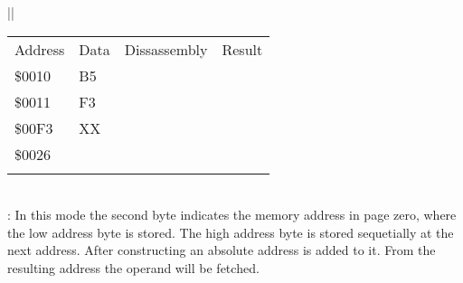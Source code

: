 \documentclass[letterpaper,10pt,english]{sphinxmanual}
\begin{document}
\begin{savenotes}
\begin{tabular}[t]{|*{1}{|}}
\begin{savenotes}\sphinxattablestart
\sphinxthistablewithglobalstyle
\centering
\begin{tabulary}{\linewidth}[t]{|T|T|T|T|}
\sphinxtoprule
\sphinxstyletheadfamily 
\sphinxAtStartPar
Address
&\sphinxstyletheadfamily 
\sphinxAtStartPar
Data
&\sphinxstyletheadfamily 
\sphinxAtStartPar
Dissassembly
&\sphinxstyletheadfamily 
\sphinxAtStartPar
Result
\\
\sphinxmidrule
\sphinxtableatstartofbodyhook
\sphinxAtStartPar
\$0010
&
\sphinxAtStartPar
B5
&%
&%
\\
\sphinxAtStartPar
\$0011
&
\sphinxAtStartPar
F3
&&\\
\sphinxAtStartPar
\$00F3
&
\sphinxAtStartPar
XX
&&\\
\sphinxAtStartPar
\$0026
&
&&\\
\sphinxbottomrule
\end{tabulary}
\sphinxtableafterendhook\par
\sphinxattableend\end{savenotes}
\\
\sphinxhline
\sphinxAtStartPar
{}: In this mode the second
byte indicates the memory address in page zero, where the low address
byte is stored. The high address byte is stored sequetially at the next
address. After constructing an absolute address  is added
to it. From the resulting address the operand will be fetched.

\sphinxAtStartPar
{}



\end{tabular}
\end{savenotes}
\end{document}
